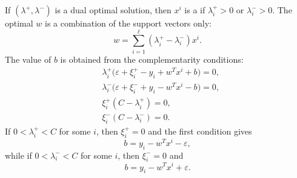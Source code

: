 If $(\lambda^+,\lambda^-)$ is a dual optimal solution, then $x^i$ is a  if $\lambda_i^+>0$ or $\lambda_i^->0$. The optimal $w$ is a combination of the support vectors only:
\[
w = \sum_{i=1}^{\ell}(\lambda_i^+ - \lambda_i^-)x^i.
\]
The value of $b$ is obtained from the complementarity conditions:
\[
\begin{aligned}
&\lambda_i^+\bigl(\varepsilon + \xi_i^+ - y_i + w^Tx^i + b\bigr) = 0,\\
&\lambda_i^-\bigl(\varepsilon + \xi_i^- + y_i - w^Tx^i - b\bigr) = 0,\\
&\xi_i^+(C - \lambda_i^+) = 0,\\
&\xi_i^-(C - \lambda_i^-) = 0.
\end{aligned}
\]
If $0<\lambda_i^+<C$ for some $i$, then $\xi_i^+=0$ and the first condition gives
\[
b = y_i - w^Tx^i - \varepsilon,
\]
while if $0<\lambda_i^-<C$ for some $i$, then $\xi_i^-=0$ and
\[
b = y_i - w^Tx^i + \varepsilon.
\]

